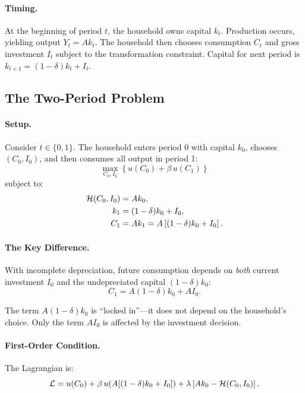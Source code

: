 \paragraph{Timing.}
At the beginning of period $t$, the household owns capital $k_t$. Production occurs, yielding output $Y_t = A k_t$. The household then chooses consumption $C_t$ and gross investment $I_t$ subject to the transformation constraint. Capital for next period is $k_{t+1} = (1-\delta) k_t + I_t$.

\subsection{The Two-Period Problem}
\label{subsec:ac-dep-two-period}

\paragraph{Setup.}
Consider $t \in \{0, 1\}$. The household enters period 0 with capital $k_0$, chooses $(C_0, I_0)$, and then consumes all output in period 1:
\begin{equation}
\max_{C_0, I_0} \left\{ u(C_0) + \beta \, u(C_1) \right\}
\label{eq:ac-dep-objective}
\end{equation}
subject to:
\begin{align}
\mathcal{H}(C_0, I_0) &= A k_0, \label{eq:ac-dep-const0} \\
k_1 &= (1-\delta) k_0 + I_0, \label{eq:ac-dep-accum0} \\
C_1 &= A k_1 = A \left[ (1-\delta) k_0 + I_0 \right]. \label{eq:ac-dep-const1}
\end{align}

\paragraph{The Key Difference.}
With incomplete depreciation, future consumption depends on \emph{both} current investment $I_0$ and the undepreciated capital $(1-\delta) k_0$:
\begin{equation}
C_1 = A (1-\delta) k_0 + A I_0.
\label{eq:ac-dep-C1}
\end{equation}

The term $A(1-\delta) k_0$ is ``locked in''---it does not depend on the household's choice. Only the term $A I_0$ is affected by the investment decision.

\paragraph{First-Order Condition.}
The Lagrangian is:
\begin{equation}
\mathcal{L} = u(C_0) + \beta \, u(A[(1-\delta)k_0 + I_0]) + \lambda \left[ A k_0 - \mathcal{H}(C_0, I_0) \right].
\label{eq:ac-dep-lagrangian}
\end{equation}

